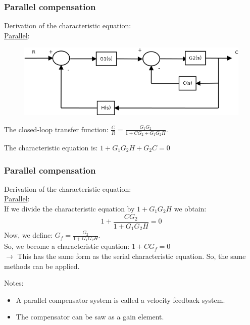 \begin{frame}
	\frametitle{Parallel compensation}
	Derivation of the characteristic equation:\\
	\underline{Parallel}:
	\begin{figure}
		\centering
		\includegraphics[width=0.9\linewidth]{Parallel_compensator}
	\end{figure}
	The closed-loop transfer function: $\frac{C}{R}=\frac{G_1G_2}{1+CG_2+G_1G_2H}$.\vspace{3mm}
	
	The characteristic equation is: $1+G_1G_2H+G_2C=0$
\end{frame}

\begin{frame}
	\frametitle{Parallel compensation}
	Derivation of the characteristic equation:\\
	\underline{Parallel}:\\
	If we divide the characteristic equation by $1+G_1G_2H$ we obtain: $$1+\frac{CG_2}{1+G_1G_2H}=0$$
	Now, we define: $G_f=\frac{G_2}{1+G_1G_2H}$.\\
	So, we become a characteristic equation: $1+CG_f=0$\\
	$\rightarrow$ This has the same form as the serial characteristic equation. So, the same methods can be applied. 
	\vspace{2mm}
	
	Notes:
	\begin{itemize}
	\item A parallel compensator system is called a velocity feedback system.
	\item The compensator can be saw as a gain element.
	\end{itemize}
\end{frame}

